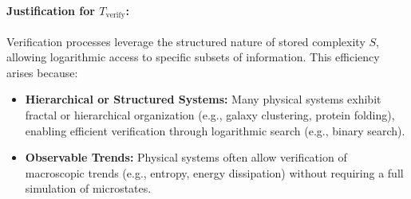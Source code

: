 \documentclass[12pt]{article}
\begin{document}
\paragraph{Justification for $T_{\text{verify}}$:}
Verification processes leverage the structured nature of stored complexity $S$, allowing logarithmic access to specific subsets of information. This efficiency arises because:
\begin{itemize}
    \item \textbf{Hierarchical or Structured Systems:} Many physical systems exhibit fractal or hierarchical organization (e.g., galaxy clustering, protein folding), enabling efficient verification through logarithmic search (e.g., binary search).
    \item \textbf{Observable Trends:} Physical systems often allow verification of macroscopic trends (e.g., entropy, energy dissipation) without requiring a full simulation of microstates.
\end{itemize}
\end{document}
